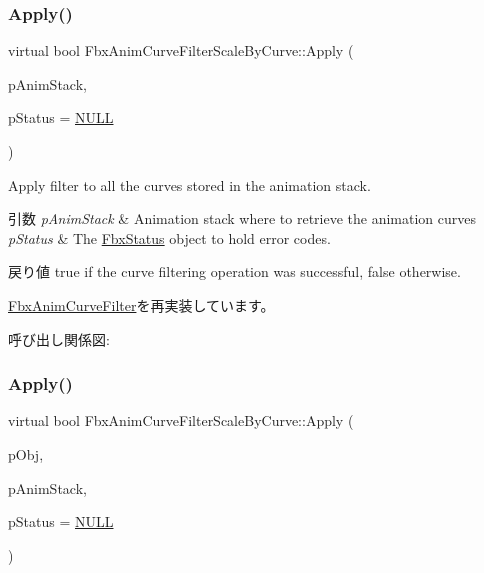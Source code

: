 \subsubsection{\texorpdfstring{Apply()}{Apply()}\hspace{0.1cm}{\footnotesize\ttfamily [1/5]}}
{\footnotesize\ttfamily virtual bool Fbx\+Anim\+Curve\+Filter\+Scale\+By\+Curve\+::\+Apply (\begin{DoxyParamCaption}\item[{\hyperlink{class_fbx_anim_stack}{Fbx\+Anim\+Stack} $\ast$}]{p\+Anim\+Stack,  }\item[{\hyperlink{class_fbx_status}{Fbx\+Status} $\ast$}]{p\+Status = {\ttfamily \hyperlink{fbxarch_8h_a070d2ce7b6bb7e5c05602aa8c308d0c4}{N\+U\+LL}} }\end{DoxyParamCaption})\hspace{0.3cm}{\ttfamily [virtual]}}

Apply filter to all the curves stored in the animation stack. 
\begin{DoxyParams}{引数}
{\em p\+Anim\+Stack} & Animation stack where to retrieve the animation curves \\
\hline
{\em p\+Status} & The \hyperlink{class_fbx_status}{Fbx\+Status} object to hold error codes. \\
\hline
\end{DoxyParams}
\begin{DoxyReturn}{戻り値}
{\ttfamily true} if the curve filtering operation was successful, {\ttfamily false} otherwise. 
\end{DoxyReturn}


\hyperlink{class_fbx_anim_curve_filter_aef3900e6180e05661c27ee484ae939c3}{Fbx\+Anim\+Curve\+Filter}を再実装しています。

呼び出し関係図\+:
\mbox{\label{class_fbx_anim_curve_filter_scale_by_curve_a7212a7c70bb1c0ae8f7c82c25de17745}} 
\subsubsection{\texorpdfstring{Apply()}{Apply()}\hspace{0.1cm}{\footnotesize\ttfamily [2/5]}}
{\footnotesize\ttfamily virtual bool Fbx\+Anim\+Curve\+Filter\+Scale\+By\+Curve\+::\+Apply (\begin{DoxyParamCaption}\item[{\hyperlink{class_fbx_object}{Fbx\+Object} $\ast$}]{p\+Obj,  }\item[{\hyperlink{class_fbx_anim_stack}{Fbx\+Anim\+Stack} $\ast$}]{p\+Anim\+Stack,  }\item[{\hyperlink{class_fbx_status}{Fbx\+Status} $\ast$}]{p\+Status = {\ttfamily \hyperlink{fbxarch_8h_a070d2ce7b6bb7e5c05602aa8c308d0c4}{N\+U\+LL}} }\end{DoxyParamCaption})\hspace{0.3cm}{\ttfamily [virtual]}}

